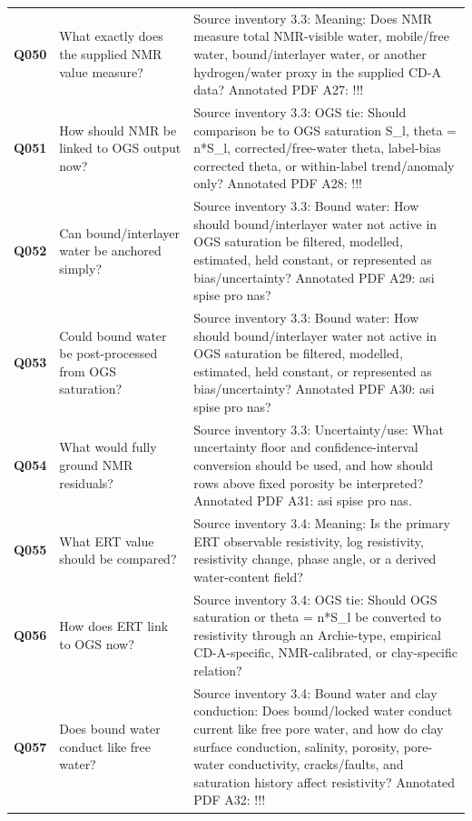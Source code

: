 \begin{longtable}{@{}L{0.10\textwidth} L{0.30\textwidth} L{0.52\textwidth}@{}}
\addlinespace[0.22em]
\textbf{Q050} & What exactly does the supplied NMR value measure? & Source inventory 3.3: Meaning: Does NMR measure total NMR-visible water, mobile/free water, bound/interlayer water, or another hydrogen/water proxy in the supplied CD-A data? Annotated PDF A27: !!!\\
\addlinespace[0.22em]
\textbf{Q051} & How should NMR be linked to OGS output now? & Source inventory 3.3: OGS tie: Should comparison be to OGS saturation S\_l, theta = n*S\_l, corrected/free-water theta, label-bias corrected theta, or within-label trend/anomaly only? Annotated PDF A28: !!!\\
\addlinespace[0.22em]
\textbf{Q052} & Can bound/interlayer water be anchored simply? & Source inventory 3.3: Bound water: How should bound/interlayer water not active in OGS saturation be filtered, modelled, estimated, held constant, or represented as bias/uncertainty? Annotated PDF A29: asi spise pro nas?\\
\addlinespace[0.22em]
\textbf{Q053} & Could bound water be post-processed from OGS saturation? & Source inventory 3.3: Bound water: How should bound/interlayer water not active in OGS saturation be filtered, modelled, estimated, held constant, or represented as bias/uncertainty? Annotated PDF A30: asi spise pro nas?\\
\addlinespace[0.22em]
\textbf{Q054} & What would fully ground NMR residuals? & Source inventory 3.3: Uncertainty/use: What uncertainty floor and confidence-interval conversion should be used, and how should rows above fixed porosity be interpreted? Annotated PDF A31: asi spise pro nas.\\
\addlinespace[0.22em]
\textbf{Q055} & What ERT value should be compared? & Source inventory 3.4: Meaning: Is the primary ERT observable resistivity, log resistivity, resistivity change, phase angle, or a derived water-content field?\\
\addlinespace[0.22em]
\textbf{Q056} & How does ERT link to OGS now? & Source inventory 3.4: OGS tie: Should OGS saturation or theta = n*S\_l be converted to resistivity through an Archie-type, empirical CD-A-specific, NMR-calibrated, or clay-specific relation?\\
\addlinespace[0.22em]
\textbf{Q057} & Does bound water conduct like free water? & Source inventory 3.4: Bound water and clay conduction: Does bound/locked water conduct current like free pore water, and how do clay surface conduction, salinity, porosity, pore-water conductivity, cracks/faults, and saturation history affect resistivity? Annotated PDF A32: !!!\\

\end{longtable}
